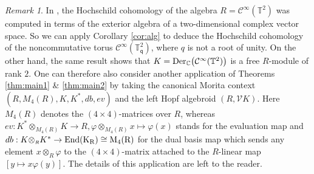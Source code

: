 \documentclass[reqno, a4paper, 10pt]{amsart}
\numberwithin{equation}{section}
\theoremstyle{plain}
\theoremstyle{definition}
\theoremstyle{remark}
\newtheorem{rem}{Remark}
\begin{document}
\begin{rem}
In \cite[Theorem 5.2]{Zharinov:2005}, the Hochschild cohomology of the algebra $R={{\mathcal C}}^{\infty}(\mathbb{T}^2)$ was computed in terms of the exterior algebra of a two-dimensional complex vector space. 
So we can apply Corollary \ref{cor:alg} to deduce the Hochschild cohomology of the noncommutative torus  ${{\mathcal C}}^{\infty}(\mathbb{T}_{{\mathsf{{q}}}}^2)$, where $q$ is not a root of unity.  On the other hand, the same result \cite[Theorem 5.2]{Zharinov:2005} shows that  $K={\rm Der}_{\mathbb{C}}\big( {{\mathcal C}}^{\infty}(\mathbb{T}^2)\big)$ 
is a  free $R$-module of  rank $2$. One can therefore also consider another application of Theorems \ref{thm:main1} \& \ref{thm:main2} by taking  the canonical Morita context $(R, M_4(R),K, K^*, db, ev)$ and the left Hopf algebroid $(R,{{\mathcal V}} K)$. Here $M_4(R)$ denotes the $(4 \times 4)$-matrices over $R$, whereas $ev : K^*{\otimes_{\scriptscriptstyle{{M_4(R)}}}}K \to R, \varphi{\otimes_{\scriptscriptstyle{{M_4(R)}}}}x \mapsto \varphi(x)$ stands for the evaluation map and $db : K{\otimes_{\scriptscriptstyle{{R}}}}K^*  \to \rm{End}(K_R) \cong M_4(R) $ for the dual basis map which sends any element $x{\otimes_{\scriptscriptstyle{{R}}}}  \varphi$ to the $(4\times 4)$-matrix attached to the $R$-linear map $\left[ y \mapsto x \varphi(y)\right]$.  The details of this application are left to the reader. 
\end{rem}



\providecommand{\bysame}{\leavevmode\hbox to3em{\hrulefill}\thinspace}
\providecommand{\MR}{\relax\ifhmode\unskip\space\fi MR }
\providecommand{\MRhref}[2]{  \href{http://www.ams.org/mathscinet-getitem?mr=#1}{#2}
}
\providecommand{\href}[2]{#2}
\end{document}

